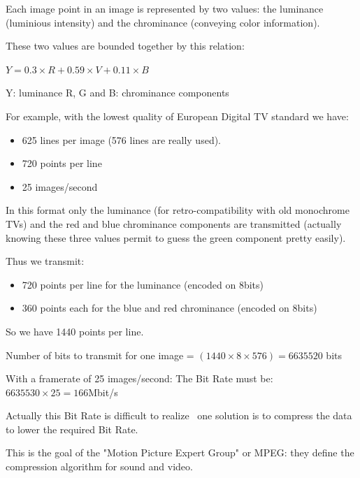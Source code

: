 \documentclass{beamer}[10pt, usepdftitle=false, handout]
\begin{document}
	\begin{frame}
	
	Each image point in an image is represented  by two values: the luminance (luminious intensity) and the chrominance (conveying color information).
	\vspace*{1em}	
	
	
	These two values are bounded together by this relation:
	\vspace*{0.5em}		
	
	$Y=0.3\times R + 0.59\times V + 0.11\times B$
	\vspace*{0.5em}	
	
	Y: luminance
	R, G and B: chrominance components
	\vspace*{0.5em}	
		
		
	For example, with the lowest quality of European Digital TV standard we have:
	\vspace*{0.5em}	
	
	\begin{itemize}
	\item{625 lines per image (576 lines are really used).}
	\item{720 points per line}
	\item{25 images/second}	
	\end{itemize}			
	\vspace*{0.5em}	
		
	In this format only the luminance (for retro-compatibility with old monochrome TVs) and the red and blue chrominance components are transmitted (actually knowing these three values permit to guess the green component pretty easily). 	
	
	\end{frame}
	
	\begin{frame}
	
		
	Thus we transmit:	
	\vspace*{1em}	
		
	\begin{itemize}
	\item{720 points per line for the luminance (encoded on 8bits)}
	\item{360 points each for the blue and red chrominance (encoded on 8bits)}
	\end{itemize}	
	\vspace*{0.5em}		
	
	So we have 1440 points per line.
	\vspace*{0.5em}	
	
	Number of bits to transmit for one image = $(1440\times 8\times 576)	= 6635520$ bits
	\vspace*{0.5em}	
	
	With a framerate of 25 images/second:
	The Bit Rate must be: $6635530\times 25=166$Mbit/s
	\vspace*{0.5em}	
		
	Actually this Bit Rate is difficult to realize \, one solution is to compress the data to lower the required Bit Rate.
	
	This is the goal of the "Motion Picture Expert Group" or MPEG: they define the compression algorithm for sound and video.		
		
	\end{frame}
\end{document}
